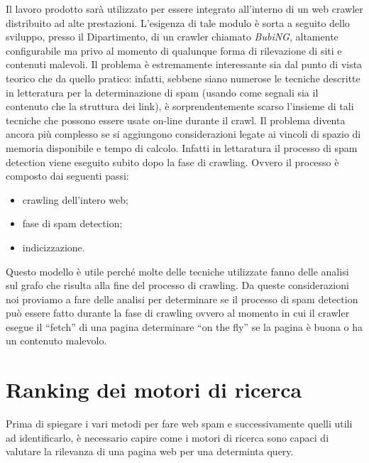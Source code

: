 Il lavoro prodotto sarà utilizzato per essere integrato	all'interno di un web crawler distribuito ad alte prestazioni. L'esigenza di tale modulo è sorta a seguito dello sviluppo, presso il Dipartimento, di un crawler chiamato {\itshape BubiNG}, altamente configurabile ma privo al momento di qualunque forma di rilevazione di siti e contenuti malevoli. Il problema è estremamente interessante sia dal punto di vista teorico che da quello pratico: infatti, sebbene
siano numerose le tecniche descritte in letteratura per la determinazione di spam (usando come segnali sia il contenuto che la struttura dei link), è sorprendentemente scarso l'insieme di tali tecniche che possono essere usate on-line durante il crawl. Il problema diventa ancora più complesso se si aggiungono considerazioni legate ai vincoli di spazio di memoria disponibile e tempo di calcolo.
Infatti in lettaratura il processo di spam detection viene eseguito subito dopo la fase di crawling. Ovvero il processo è composto dai seguenti passi:
\begin{itemize}
 \item crawling dell'intero web;
 \item fase di spam detection;
 \item indicizzazione.
\end{itemize}
Questo modello è utile perché molte delle tecniche utilizzate fanno delle analisi sul grafo che risulta alla fine del processo di crawling. Da queste considerazioni noi proviamo a fare delle analisi per determinare se il processo di spam detection può essere fatto durante la fase di crawling ovvero al momento in cui il crawler esegue il ``fetch'' di una pagina determinare ``on the fly'' se la pagina è buona o ha un contenuto malevolo. 

\section{Ranking dei motori di ricerca}
Prima di spiegare i vari metodi per fare web spam e successivamente quelli utili ad identificarlo, è necessario capire come i motori di ricerca sono capaci di valutare la rilevanza di una pagina web per una determinta query.

